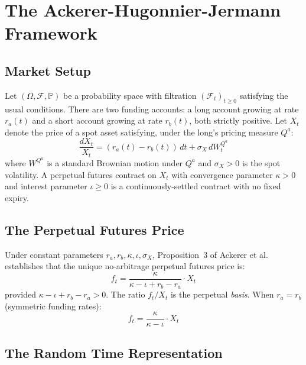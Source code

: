 \documentclass[10pt,twocolumn]{article}
\theoremstyle{plain}
\theoremstyle{definition}
\newcommand{\Qa}{Q^a}
\newcommand{\Prob}{\mathbb{P}}
\newcommand{\F}{\mathcal{F}}
\begin{document}
\section{The Ackerer-Hugonnier-Jermann Framework}
\label{sec:ahj}

\subsection{Market Setup}

Let $(\Omega, \F, \Prob)$ be a probability space with filtration
$(\F_t)_{t\geq 0}$ satisfying the usual conditions. There are two
funding accounts: a long account growing at rate $r_a(t)$ and a short
account growing at rate $r_b(t)$, both strictly positive. Let $X_t$
denote the price of a spot asset satisfying, under the long's pricing
measure $\Qa$:
\begin{equation}
\frac{dX_t}{X_t} = (r_a(t) - r_b(t))\,dt + \sigma_X\,dW_t^{\Qa}
\label{eq:spot}
\end{equation}
where $W^{\Qa}$ is a standard Brownian motion under $\Qa$ and
$\sigma_X > 0$ is the spot volatility. A perpetual futures contract
on $X_t$ with convergence parameter $\kappa > 0$ and interest
parameter $\iota \geq 0$ is a continuously-settled contract with
no fixed expiry.

\subsection{The Perpetual Futures Price}

Under constant parameters $r_a, r_b, \kappa, \iota, \sigma_X$,
Proposition~3 of Ackerer et al.\ \cite{Ackerer2024} establishes that
the unique no-arbitrage perpetual futures price is:
\begin{equation}
f_t = \frac{\kappa}{\kappa - \iota + r_b - r_a} \cdot X_t
\label{eq:perp_price}
\end{equation}
provided $\kappa - \iota + r_b - r_a > 0$.
The ratio $f_t/X_t$ is the perpetual \textit{basis}. When
$r_a = r_b$ (symmetric funding rates):
\begin{equation}
f_t = \frac{\kappa}{\kappa - \iota} \cdot X_t
\label{eq:perp_symmetric}
\end{equation}

\subsection{The Random Time Representation}
\label{sec:rtr}
\end{document}

